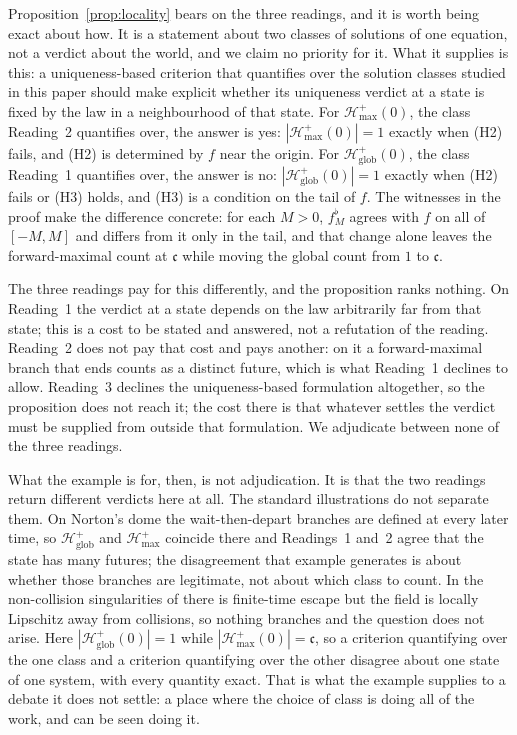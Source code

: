 \documentclass[12pt]{article}
\theoremstyle{plain}
\theoremstyle{definition}
\theoremstyle{remark}
\newcommand{\cont}{\mathfrak{c}}
\newcommand{\Hglob}{\mathcal{H}^{+}_{\mathrm{glob}}}
\newcommand{\Hmax}{\mathcal{H}^{+}_{\max}}
\begin{document}
Proposition~\ref{prop:locality} bears on the three readings, and it is worth
being exact about how. It is a statement about two classes of solutions of one
equation, not a verdict about the world, and we claim no priority for it. What
it supplies is this: a uniqueness-based criterion that quantifies over the
solution classes studied in this paper should make explicit whether its
uniqueness verdict at a state is fixed by the law in a neighbourhood of that
state. For $\Hmax(0)$, the class Reading~2 quantifies over, the answer is yes:
$|\Hmax(0)|=1$ exactly when (H2) fails, and (H2) is determined by $f$ near the
origin. For $\Hglob(0)$, the class Reading~1 quantifies over, the answer is no:
$|\Hglob(0)|=1$ exactly when (H2) fails or (H3) holds, and (H3) is a condition
on the tail of $f$. The witnesses in the proof make the difference concrete: for
each $M>0$, $f^{\flat}_{M}$ agrees with $f$ on all of $[-M,M]$ and differs from
it only in the tail, and that change alone leaves the forward-maximal count at
$\cont$ while moving the global count from $1$ to $\cont$.

The three readings pay for this differently, and the proposition ranks nothing.
On Reading~1 the verdict at a state depends on the law arbitrarily far from that
state; this is a cost to be stated and answered, not a refutation of the
reading. Reading~2 does not pay that cost and pays another: on it a
forward-maximal branch that ends counts as a distinct future, which is what
Reading~1 declines to allow. Reading~3 declines the uniqueness-based formulation
altogether, so the proposition does not reach it; the cost there is that
whatever settles the verdict must be supplied from outside that formulation. We
adjudicate between none of the three readings.

What the example is for, then, is not adjudication. It is that the two readings
return different verdicts here at all. The standard illustrations do not
separate them. On Norton's dome \citep{Norton} the wait-then-depart branches are
defined at every later time, so $\Hglob$ and $\Hmax$ coincide there and
Readings~1 and~2 agree that the state has many futures; the disagreement that
example generates is about whether those branches are legitimate, not about
which class to count. In the non-collision singularities of \citet{Xia} there is
finite-time escape but the field is locally Lipschitz away from collisions, so
nothing branches and the question does not arise. Here $|\Hglob(0)|=1$ while
$|\Hmax(0)|=\cont$, so a criterion quantifying over the one class and a criterion
quantifying over the other disagree about one state of one system, with every
quantity exact. That is what the example supplies to a debate it does not
settle: a place where the choice of class is doing all of the work, and can be
seen doing it.
\end{document}
